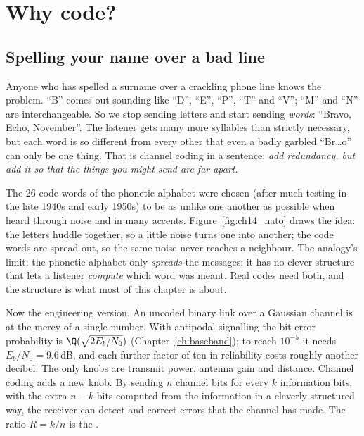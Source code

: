 \section{Why code?}
\label{sec:ch14:why}

\subsection{Spelling your name over a bad line}

Anyone who has spelled a surname over a crackling phone line knows the problem. ``B'' comes out
sounding like ``D'', ``E'', ``P'', ``T'' and ``V''; ``M'' and ``N'' are interchangeable. So we stop
sending letters and start sending \emph{words}: ``Bravo, Echo, November''. The listener gets many
more syllables than strictly necessary, but each word is so different from every other that even a
badly garbled ``Br\dots o'' can only be one thing. That is channel coding in a sentence: \emph{add
redundancy, but add it so that the things you might send are far apart}.

\begin{analogy}
The 26 code words of the phonetic alphabet were chosen (after much testing in the late 1940s and
early 1950s) to be as unlike one another as possible when heard through noise and in many accents.
Figure~\ref{fig:ch14_nato} draws the idea: the letters huddle together, so a little noise turns
one into another; the code words are spread out, so the same noise never reaches a neighbour. The
analogy's limit: the phonetic alphabet only \emph{spreads} the messages; it has no clever structure
that lets a listener \emph{compute} which word was meant. Real codes need both, and the structure is
what most of this chapter is about.
\end{analogy}


Now the engineering version. An uncoded binary link over a Gaussian channel is at the mercy of a
single number. With antipodal signalling the bit error probability is $\Q(\sqrt{2E_b/N_0})$
(Chapter~\ref{ch:baseband}); to reach $10^{-5}$ it needs $E_b/N_0=9.6$\,dB, and each further factor
of ten in reliability costs roughly another decibel. The only knobs are transmit power, antenna gain
and distance. Channel coding adds a new knob. By sending $n$ channel bits for every $k$ information
bits, with the extra $n-k$ bits computed from the information in a cleverly structured way, the
receiver can detect and correct errors that the channel has made. The ratio $R=k/n$ is the
.

